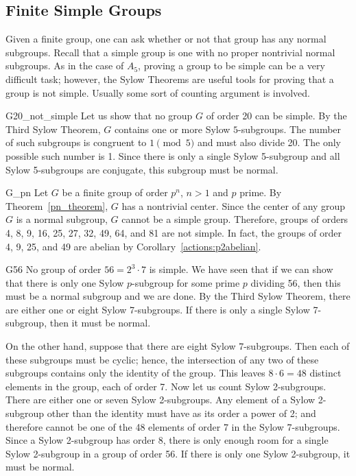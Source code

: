  
 
\subsection*{Finite Simple Groups}
 
 
Given a finite group, one can ask whether or not that group has any
normal subgroups. Recall that a simple group is one with no proper
nontrivial normal subgroups. As in the case of $A_5$, proving a group
to be simple can be a very difficult task; however, the Sylow Theorems
are useful tools for proving that a group is not simple. Usually
some sort of counting argument is involved.
 
 
\begin{example}{G20_not_simple}
Let us show that no group $G$ of order 20 can be simple.  By the Third
Sylow Theorem, $G$ contains one or more Sylow $5$-subgroups. The number
of such subgroups is congruent to $1 \pmod{5}$ and must also divide
20.  The only possible such number is 1.  Since there is only a
single Sylow 5-subgroup and all Sylow 5-subgroups are conjugate, this
subgroup must be normal. 
\end{example}
 
 
 
\begin{example}{G_pn}
Let $G$ be a finite group of order $p^n$, $n > 1$ and $p$ prime.  By 
Theorem~\ref{pn_theorem}, $G$ has a nontrivial center. Since the center of any
group $G$ is a normal subgroup, $G$ cannot be a simple group.
Therefore, groups of orders 4, 8, 9, 16, 25, 27, 32, 49, 64, and 81
are not simple.  In fact, the groups of order 4, 9, 25, and 49 are 
abelian by Corollary~\ref{actions:p2abelian}.
\end{example}
 
 
 
\begin{example}{G56}
No group of order $56= 2^3 \cdot 7$ is simple.  We have seen that if
we can show that there is only one Sylow $p$-subgroup for some prime
$p$ dividing 56, then this must be a normal subgroup and we are done.
By the Third Sylow Theorem, there are either one or eight Sylow
7-subgroups.  If there is only a single Sylow 7-subgroup, then it must
be normal.  
 
 
On the other hand, suppose that there are eight Sylow 7-subgroups.
Then each of these subgroups must be cyclic; hence, the intersection
of any two of these subgroups contains only the identity of the group.
This leaves $8 \cdot 6 = 48$ distinct elements in the group, each of
order 7. Now let us count Sylow 2-subgroups. There are either one or
seven Sylow 2-subgroups.  Any element of a Sylow 2-subgroup other than
the identity must have as its order a  power of 2; and therefore
cannot be
one of the 48 elements of order 7 in the Sylow 7-subgroups. Since a
Sylow 2-subgroup has order 8, there is only enough room for a single
Sylow 2-subgroup in a group of order 56.  If there is only one Sylow
2-subgroup, it must be normal. 
\end{example}
 
